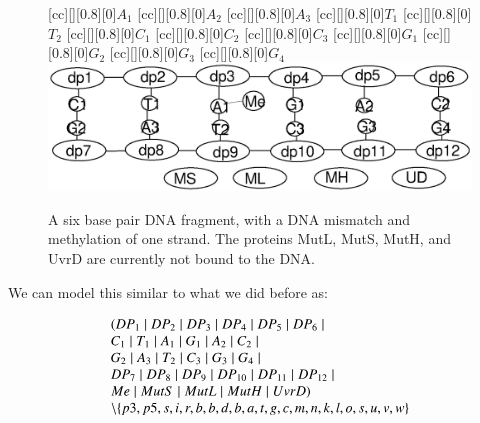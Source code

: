 \begin{figure}[h!]
[cc][][0.8][0]{$A_1$}
[cc][][0.8][0]{$A_2$}
[cc][][0.8][0]{$A_3$}
[cc][][0.8][0]{$T_1$}
[cc][][0.8][0]{$T_2$}
[cc][][0.8][0]{$C_1$}
[cc][][0.8][0]{$C_2$}
[cc][][0.8][0]{$C_3$}
[cc][][0.8][0]{$G_1$}
[cc][][0.8][0]{$G_2$}
[cc][][0.8][0]{$G_3$}
[cc][][0.8][0]{$G_4$}
  \centering
    \includegraphics[width=1.0\textwidth]{mmr/state1}
  \caption[A six base pair DNA fragment.]{A six base pair DNA fragment, with a DNA mismatch and methylation of one strand. The proteins MutL, MutS, MutH, and UvrD are currently not bound to the DNA.}
  \label{fig:state1}
\end{figure}

We can model this similar to what we did before as:

$$\begin{array}{l}
(DP_1 \; \vert \; DP_2 \; \vert \; DP_3 \; \vert \; DP_4 \; \vert \; DP_5 \; \vert \; DP_6 \; \vert \; \\
C_1 \; \vert \; T_1 \; \vert \; A_1 \; \vert \; G_1 \; \vert \; A_2 \; \vert \; C_2 \; \vert \; \\
G_2 \; \vert \; A_3 \; \vert \; T_2 \; \vert \; C_3 \; \vert \; G_3 \; \vert \; G_4 \; \vert \; \\
DP_7 \; \vert \; DP_8 \; \vert \; DP_9 \; \vert \; DP_{10} \; \vert \; DP_{11} \; \vert \; DP_{12} \; \vert \; \\
Me \; \vert \; MutS \; \vert \; MutL \; \vert \; MutH \; \vert \; UvrD) \\
\setminus\{p3, p5, s, i, r, b, b, d, b, a, t, g, c, m, n, k, l, o, s, u, v, w\} 
\end{array}$$ 

